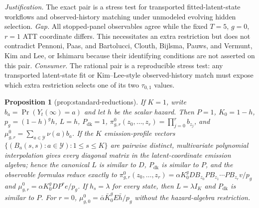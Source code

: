 \documentclass{article}
\newtheorem{proposition}{Proposition}
\begin{document}
\par\smallskip\noindent \textit{Justification.} The exact pair is a stress test for transported fitted-latent-state workflows and observed-history matching under unmodeled evolving hidden selection. \textit{Gap.} All stopped-panel observables agree while the fixed \(T=5\), \(g=0\), \(r=1\) ATT coordinate differs. This necessitates an extra restriction but does not contradict Pennoni, Paas, and Bartolucci, Clouth, Bijlsma, Pauws, and Vermunt, Kim and Lee, or Ishimaru because their identifying conditions are not asserted on this pair. \textit{Consumer.} The rational pair is a reproducible stress test: any transported latent-state fit or Kim--Lee-style observed-history match must expose which extra restriction selects one of its two \(\tau_{0,1}\) values.

\begin{proposition}[prop:standard-reductions]\label{prop:standard-reductions}
If \(K=1\), write \(b_a=\Pr(Y_t(\infty)=a)\) and let \(h\) be the scalar hazard. Then \(P=1\), \(K_0=1-h\), \(p_g=(1-h)^gh\), \(L=h\), \(P_{\mathrm{dk}}=1\), \(\pi^0_{g,r}(z_0,\ldots,z_r)=\prod_{j=0}^r b_{z_j}\), and \(\mu^0_{g,r}=\sum_{a\in\mathcal Y}\nu(a)b_a\). If the \(K\) emission-profile vectors \(\{(B_a(s,s):a\in\mathcal Y):1\le s\le K\}\) are pairwise distinct, multivariate polynomial interpolation gives every diagonal matrix in the latent-coordinate emission algebra; hence the canonical \(L\) is similar to \(D\), \(P_{\mathrm{dk}}\) is similar to \(P\), and the observable formulas reduce exactly to \(\pi^0_{g,r}(z_0,\ldots,z_r)=\alpha K_0^gDB_{z_0}PB_{z_1}\cdots PB_{z_r}v/p_g\) and \(\mu^0_{g,r}=\alpha K_0^gDP^re/p_g\). If \(h_s=\lambda\) for every state, then \(L=\lambda I_K\) and \(P_{\mathrm{dk}}\) is similar to \(P\). For \(r=0\), \(\mu^0_{g,0}=\bar\alpha\bar K_0^gE\bar h/p_g\) without the hazard-algebra restriction.
\end{proposition}
\end{document}
